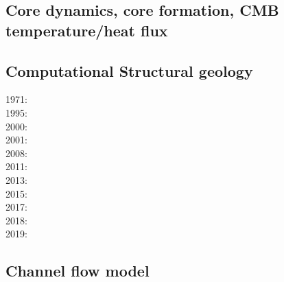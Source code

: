 \subsection{Core dynamics, core formation, CMB temperature/heat flux}

\noindent
{\scriptsize
\cite{hayu96}
\cite{vayu98}
\cite{nata04c}
\cite{lahb08}\cite{gost08}\cite{sata08}
\cite{kisn09}
\cite{nata10}\cite{lamg10}\cite{sate10}
\cite{zhzh11}
\cite{cobu12}\cite{trbh12}
\cite{nata13}
\cite{yiym19}
}

\subsection{Computational Structural geology}

\noindent
{\scriptsize
1971: \cite{stbe71}\\
1995: \cite{fige95}\\
2000: \cite{acgf00}\cite{trla00}\\
2001: \cite{masc01}\\
2008: \cite{manc08}\cite{scsf08}\\
2011: \cite{frem11}\\
2013: \cite{soma13}\\
2015: \cite{pevp15}\\
2017: \cite{naam17}\cite{scdu17}\\
2018: \cite{naam18}\\
2019: \cite{llor19}\cite{yada19}\cite{sogh19}
}

\subsection{Channel flow model} 

